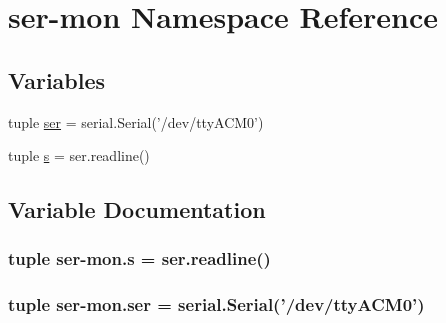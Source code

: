 \hypertarget{namespaceser-mon}{\section{ser-\/mon Namespace Reference}
\label{namespaceser-mon}
}
\subsection*{Variables}
\begin{DoxyCompactItemize}
\item 
tuple \hyperlink{namespaceser-mon_a172fe4d911910417504386161b9d1891}{ser} = serial.\-Serial('/dev/tty\-A\-C\-M0')
\item 
tuple \hyperlink{namespaceser-mon_a37e0cdc510e97e5ed77ef9606c5659f0}{s} = ser.\-readline()
\end{DoxyCompactItemize}


\subsection{Variable Documentation}
\hypertarget{namespaceser-mon_a37e0cdc510e97e5ed77ef9606c5659f0}{
\subsubsection[{s}]{\setlength{\rightskip}{0pt plus 5cm}tuple {\bf ser}-\/mon.\-s = ser.\-readline()}}\label{namespaceser-mon_a37e0cdc510e97e5ed77ef9606c5659f0}
\hypertarget{namespaceser-mon_a172fe4d911910417504386161b9d1891}{
\subsubsection[{ser}]{\setlength{\rightskip}{0pt plus 5cm}tuple ser-\/mon.\-ser = serial.\-Serial('/dev/tty\-A\-C\-M0')}}\label{namespaceser-mon_a172fe4d911910417504386161b9d1891}

